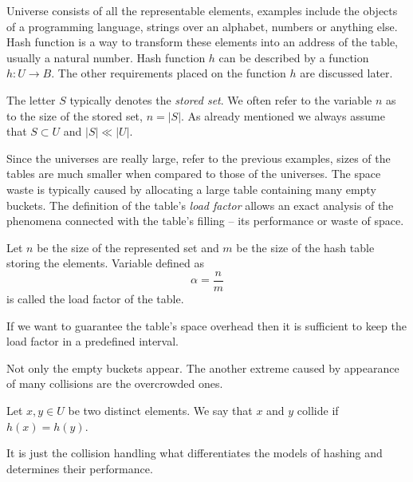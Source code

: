 Universe consists of all the representable elements, examples include the objects of a programming language, strings over an alphabet, numbers or anything else. Hash function is a way to transform these elements into an address of the table, usually a natural number. Hash function $h$ can be described by a function $h: U \rightarrow B$. The other requirements placed on the function $h$ are discussed later.

The letter $S$ typically denotes the \emph{stored set}. We often refer to the variable $n$ as to the size of the stored set, $n = |S|$. As already mentioned we always assume that $S \subset U$ and $|S| \ll |U|$.

Since the universes are really large, refer to the previous examples, sizes of the tables are much smaller when compared to those of the universes. The space waste is typically caused by allocating a large table containing many empty buckets. The definition of the table's \emph{load factor} allows an exact analysis of the phenomena connected with the table's filling -- its performance or waste of space.

\begin{definition}
\label{definition-load-factor}
Let $n$ be the size of the represented set and $m$ be the size of the hash table storing the elements. Variable defined as \[ \alpha = \frac{n}{m} \] is called the load factor of the table.
\end{definition}

If we want to guarantee the table's space overhead then it is sufficient to keep the load factor in a predefined interval.

Not only the empty buckets appear. The another extreme caused by appearance of many collisions are the overcrowded ones. 
\begin{definition}[Collision]
\label{definition-collision}
Let $x, y \in U$ be two distinct elements. We say that $x$ and $y$ collide if $h(x) = h(y)$.
\end{definition}

It is just the collision handling what differentiates the models of hashing and determines their performance.

